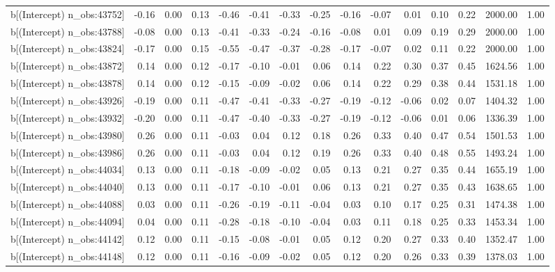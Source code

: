\begin{table}[ht]
\begin{tabular}{rrrrrrrrrrrrrrr}
  b[(Intercept) n\_obs:43752] & -0.16 & 0.00 & 0.13 & -0.46 & -0.41 & -0.33 & -0.25 & -0.16 & -0.07 & 0.01 & 0.10 & 0.22 & 2000.00 & 1.00 \\ 
  b[(Intercept) n\_obs:43788] & -0.08 & 0.00 & 0.13 & -0.41 & -0.33 & -0.24 & -0.16 & -0.08 & 0.01 & 0.09 & 0.19 & 0.29 & 2000.00 & 1.00 \\ 
  b[(Intercept) n\_obs:43824] & -0.17 & 0.00 & 0.15 & -0.55 & -0.47 & -0.37 & -0.28 & -0.17 & -0.07 & 0.02 & 0.11 & 0.22 & 2000.00 & 1.00 \\ 
  b[(Intercept) n\_obs:43872] & 0.14 & 0.00 & 0.12 & -0.17 & -0.10 & -0.01 & 0.06 & 0.14 & 0.22 & 0.30 & 0.37 & 0.45 & 1624.56 & 1.00 \\ 
  b[(Intercept) n\_obs:43878] & 0.14 & 0.00 & 0.12 & -0.15 & -0.09 & -0.02 & 0.06 & 0.14 & 0.22 & 0.29 & 0.38 & 0.44 & 1531.18 & 1.00 \\ 
  b[(Intercept) n\_obs:43926] & -0.19 & 0.00 & 0.11 & -0.47 & -0.41 & -0.33 & -0.27 & -0.19 & -0.12 & -0.06 & 0.02 & 0.07 & 1404.32 & 1.00 \\ 
  b[(Intercept) n\_obs:43932] & -0.20 & 0.00 & 0.11 & -0.47 & -0.40 & -0.33 & -0.27 & -0.19 & -0.12 & -0.06 & 0.01 & 0.06 & 1336.39 & 1.00 \\ 
  b[(Intercept) n\_obs:43980] & 0.26 & 0.00 & 0.11 & -0.03 & 0.04 & 0.12 & 0.18 & 0.26 & 0.33 & 0.40 & 0.47 & 0.54 & 1501.53 & 1.00 \\ 
  b[(Intercept) n\_obs:43986] & 0.26 & 0.00 & 0.11 & -0.03 & 0.04 & 0.12 & 0.19 & 0.26 & 0.33 & 0.40 & 0.48 & 0.55 & 1493.24 & 1.00 \\ 
  b[(Intercept) n\_obs:44034] & 0.13 & 0.00 & 0.11 & -0.18 & -0.09 & -0.02 & 0.05 & 0.13 & 0.21 & 0.27 & 0.35 & 0.44 & 1655.19 & 1.00 \\ 
  b[(Intercept) n\_obs:44040] & 0.13 & 0.00 & 0.11 & -0.17 & -0.10 & -0.01 & 0.06 & 0.13 & 0.21 & 0.27 & 0.35 & 0.43 & 1638.65 & 1.00 \\ 
  b[(Intercept) n\_obs:44088] & 0.03 & 0.00 & 0.11 & -0.26 & -0.19 & -0.11 & -0.04 & 0.03 & 0.10 & 0.17 & 0.25 & 0.31 & 1474.38 & 1.00 \\ 
  b[(Intercept) n\_obs:44094] & 0.04 & 0.00 & 0.11 & -0.28 & -0.18 & -0.10 & -0.04 & 0.03 & 0.11 & 0.18 & 0.25 & 0.33 & 1453.34 & 1.00 \\ 
  b[(Intercept) n\_obs:44142] & 0.12 & 0.00 & 0.11 & -0.15 & -0.08 & -0.01 & 0.05 & 0.12 & 0.20 & 0.27 & 0.33 & 0.40 & 1352.47 & 1.00 \\ 
  b[(Intercept) n\_obs:44148] & 0.12 & 0.00 & 0.11 & -0.16 & -0.09 & -0.02 & 0.05 & 0.12 & 0.20 & 0.26 & 0.33 & 0.39 & 1378.03 & 1.00 \\ 

\end{tabular}
\end{table}

